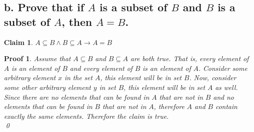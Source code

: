 \documentclass{article}
\newtheorem*{claim}{Claim}
\newtheorem*{poof}{Proof}
\begin{document}
\subsection*{b. Prove that if $A$ is a subset of $B$ and $B$ is a subset of $A$, then $A=B$.}
\begin{claim}
    $A \subseteq B \wedge B \subseteq A \rightarrow A = B$
\end{claim}
\begin{poof}
    Assume that $A \subseteq B$ and $B \subseteq A$ are both true. That is, every element of $A$ is an element of $B$ and every element of $B$ is an element of $A$. Consider some arbitrary element $x$ in the set $A$, this element will be in set $B$. Now, consider some other arbitrary element $y$ in set $B$, this element will be in set $A$ as well. Since there are no elements that can be found in $A$ that are not in $B$ and no elements that can be found in $B$ that are not in $A$, therefore $A$ and $B$ contain exactly the same elements. Therefore the claim is true. \\ 
    \qed\end{poof}
\end{document}
